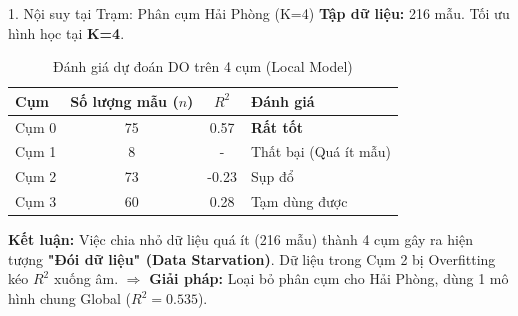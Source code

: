 \documentclass[aspectratio=169]{beamer}
\begin{document}
\begin{frame}{1. Nội suy tại Trạm: Phân cụm Hải Phòng (K=4)}
    \textbf{Tập dữ liệu:} 216 mẫu. Tối ưu hình học tại \textbf{K=4}.

    \vspace{0.2cm}
    \begin{table}[]
        \centering
        \caption{Đánh giá dự đoán DO trên 4 cụm (Local Model)}
        \renewcommand{\arraystretch}{1.2}
        \begin{tabular}{lccl}
            \toprule
            \textbf{Cụm} & \textbf{Số lượng mẫu ($n$)} & \textbf{$R^2$} & \textbf{Đánh giá}     \\
            \midrule
            Cụm 0        & 75                          & 0.57           & \textbf{Rất tốt}      \\
            Cụm 1        & 8                           & -              & Thất bại (Quá ít mẫu) \\
            Cụm 2        & 73                          & -0.23          & Sụp đổ                \\
            Cụm 3        & 60                          & 0.28           & Tạm dùng được         \\
            \bottomrule
        \end{tabular}
    \end{table}

    \vspace{0.2cm}
    \textbf{Kết luận:} Việc chia nhỏ dữ liệu quá ít (216 mẫu) thành 4 cụm gây ra hiện tượng \textbf{"Đói dữ liệu" (Data Starvation)}. Dữ liệu trong Cụm 2 bị Overfitting kéo $R^2$ xuống âm.
    $\Rightarrow$ \textbf{Giải pháp:} Loại bỏ phân cụm cho Hải Phòng, dùng 1 mô hình chung Global ($R^2 = 0.535$).
\end{frame}
\end{document}
